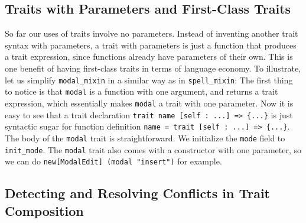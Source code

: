 \begin{comment}
\subparagraph{Mutually dependent traits} When two traits are composed, any two
methods in those two traits can refer to each other via the self-reference. We
say these two traits are \emph{mutually dependent}. The next example, though a
bit contrived, illustrates this point.

\noindent By utilizing trait requirements, the \lstinline{isEven} and
\lstinline{isOdd} methods can refer to each other in two different traits.
\end{comment}


\subsection{Traits with Parameters and First-Class Traits}\label{subsec:cons}

So far our uses of traits involve no parameters. Instead of inventing another trait
syntax with parameters, a trait with parameters is just a function that produces
a trait expression, since functions already have parameters of their own. This
is one benefit of having first-class traits in terms of language economy. To
illustrate, let us simplify \lstinline{modal_mixin} in a similar way as in \lstinline{spell_mixin}:
The first thing to notice is that \lstinline{modal} is a function with one
argument, and returns a trait expression, which essentially makes
\lstinline{modal} a trait with one parameter.
Now it is easy to see that a trait declaration
\lstinline$trait name [self : ...] => {...}$ is just syntactic sugar for
function definition \lstinline$name = trait [self : ...] => {...}$. The body of
the \lstinline{modal} trait is straightforward. We initialize the
\lstinline{mode} field to \lstinline{init_mode}.
The \lstinline{modal} trait also comes with a constructor with one parameter,
so we can do \lstinline{new[ModalEdit] (modal "insert")} for example.

\subsection{Detecting and Resolving Conflicts in Trait Composition}

